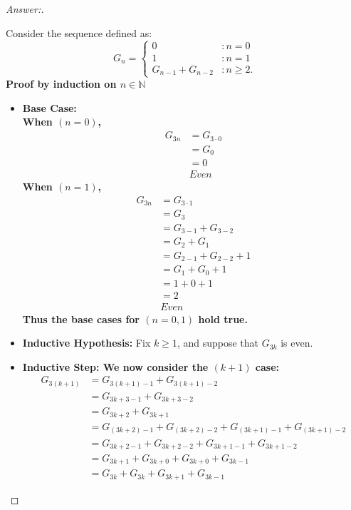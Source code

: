 \documentclass[11pt]{article}
\theoremstyle{definition}
\theoremstyle{definition}
\theoremstyle{definition}
\begin{document}
\begin{proof}[Answer:] \
\item Consider the sequence defined as:
\[
G_n = \begin{cases} 0 & : n = 0 \\
1 & : n = 1 \\
G_{n - 1} + G_{n - 2} & : n \geq 2.
\end{cases}
\]
\textbf{Proof by induction on $n \in \mathbb{N}$}
\begin{itemize}
\item \textbf{Base Case:}
\\ \hspace*{20mm} \textbf{When $(n = 0)$,}
\begin{align*}
G_{3n} &= G_{3 \cdot 0} \\
&= G_0 \\
&= 0 \\
&Even
\end{align*}
\hspace*{20mm} \textbf{When $(n = 1)$,}
\begin{align*}
G_{3n} &= G_{3 \cdot 1} \\
&= G_3 \\
&= G_{3 - 1} + G_{3 - 2} \\
&= G_{2} + G_{1} \\
&= G_{2 - 1} + G_{2 - 2} + 1 \\
&= G_{1} + G_{0} + 1 \\
&= 1 + 0 + 1 \\
&= 2 \\
&Even
\end{align*}
\textbf{Thus the base cases for $(n = 0, 1)$ hold true.}
\item \textbf{Inductive Hypothesis:} Fix $k \geq 1$, and suppose that $G_{3k}$ is even.
\item \textbf{Inductive Step: We now consider the $(k+1)$ case:}
\begin{align*}
G_{3(k + 1)} &= G_{3(k + 1) - 1}  + G_{3(k + 1) - 2} \\
&= G_{3k + 3 - 1}  + G_{3k + 3 - 2} \\
&= G_{3k + 2}  + G_{3k + 1} \\
&= G_{(3k + 2) - 1}  + G_{(3k + 2) - 2} + G_{(3k + 1) - 1} + G_{(3k + 1) - 2} \\
&= G_{3k + 2 - 1}  + G_{3k + 2 - 2} + G_{3k + 1 - 1} + G_{3k + 1 - 2} \\
&= G_{3k + 1}  + G_{3k + 0} + G_{3k + 0} + G_{3k - 1} \\
&= G_{3k} + G_{3k} + G_{3k + 1} + G_{3k - 1}

\end{align*}
\end{itemize}
\end{proof}
\end{document}
